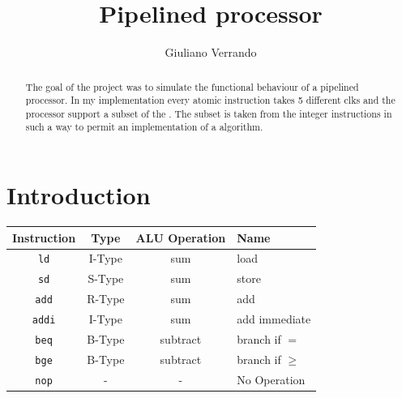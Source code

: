 \documentclass{article}
\title{Pipelined \RISCV processor}
\author{Giuliano Verrando}
\begin{document}
\maketitle


\begin{abstract}
The goal of the project was to simulate the functional behaviour of a \RISCV pipelined processor.
In my implementation every atomic instruction takes 5 different \glspl{clk} and the processor support a subset of the \RISCV \ISA.
The subset is taken from the integer instructions in such a way to permit an implementation of a \sort algorithm.
\end{abstract}
\clearpage
\tableofcontents
\clearpage

\printglossary[type=\acronymtype]
\clearpage

\section{Introduction}

\begin{center}
\begin{tabular}{|c |c c ||l|} 
 \hline
 Instruction & Type & ALU Operation & Name \\ 
 \hline\hline
 \texttt{ld} & I-Type & sum &  load \\ 
 \hline
 \texttt{sd} & S-Type & sum &  store \\
 \hline
 \texttt{add} & R-Type & sum &  add \\
 \hline
 \texttt{addi} & I-Type & sum &  add immediate \\
 \hline
  \texttt{beq} & B-Type & subtract & branch if $=$ \\
 \hline
  \texttt{bge} & B-Type & subtract & branch if $\geq$ \\
 \hline
 \texttt{nop} & - & - & No Operation \\
 \hline
\end{tabular}
\end{center}
\end{document}
